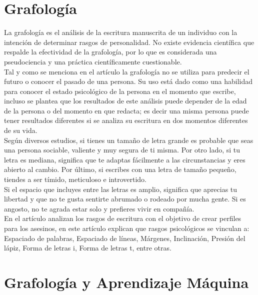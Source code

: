 \documentclass[10pt, a4paper]{article}
\begin{document}
    \section{Grafolog\'ia}
    
        La grafología es el análisis de la escritura manuscrita de un individuo con la intención de determinar rasgos de personalidad. 
        No existe evidencia científica que respalde la efectividad de la grafología, por lo que es considerada una pseudociencia 
        y una práctica científicamente cuestionable.\\ 

        Tal y como se menciona en el art\'iculo \cite{19} la grafolog\'ia no se utiliza para predecir el futuro o conocer el pasado de una persona. Su uso 
        est\'a dado como una habilidad para conocer el estado psicol\'ogico de la persona en el momento que escribe, incluso se plantea que los resultados de este an\'alisis 
        puede depender de la edad de la persona o del momento en que redacta; es decir una misma persona puede tener resultados diferentes si se analiza su escritura en dos momentos 
        diferentes de su vida.\\

        Según diversos estudios, si tienes un tamaño de letra grande es probable que seas una persona sociable, valiente y muy segura de ti misma. 
        Por otro lado, si tu letra es mediana, significa que te adaptas fácilmente a las circunstancias y eres abierto al cambio. 
        Por \'ultimo, si escribes con una letra de tamaño pequeño, tiendes a ser tímido, meticuloso e introvertido.\\

        Si el espacio que incluyes entre las letras es amplio, significa que aprecias tu libertad y que no te gusta sentirte abrumado o rodeado por mucha gente. 
        Si es angosto, no te agrada estar solo y prefieres vivir en compañía.\\

        En el art\'iculo \cite{17} analizan los rasgos de escritura con el objetivo de crear perfiles para los asesinos, en este art\'iculo explican que 
        rasgos psicol\'ogicos se vinculan a: Espaciado de palabras, Espaciado de l\'ineas, M\'argenes, Inclinaci\'on, Presi\'on del l\'apiz, Forma de letras i, Forma de letras t, entre otras. \\ 


    
    \section{Grafolog\'ia y Aprendizaje M\'aquina}
    
\end{document}
